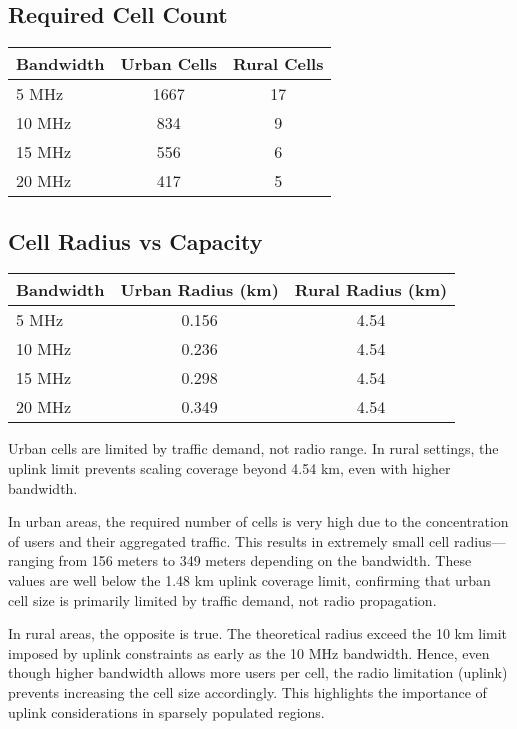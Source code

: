\documentclass[a4paper,12pt]{article}
\begin{document}
\subsection*{Required Cell Count}
\begin{center}
\begin{tabular}{lcc}
\toprule
Bandwidth & Urban Cells & Rural Cells \\
\midrule
5 MHz & 1667 & 17 \\
10 MHz & 834 & 9 \\
15 MHz & 556 & 6 \\
20 MHz & 417 & 5 \\
\bottomrule
\end{tabular}
\end{center}

\subsection*{Cell Radius vs Capacity}
\begin{center}
\begin{tabular}{lcc}
\toprule
Bandwidth & Urban Radius (km) & Rural Radius (km) \\
\midrule
5 MHz & 0.156 & 4.54 \\
10 MHz & 0.236 & 4.54 \\
15 MHz & 0.298 & 4.54 \\
20 MHz & 0.349 & 4.54 \\
\bottomrule
\end{tabular}
\end{center}

Urban cells are limited by traffic demand, not radio range. In rural settings, the uplink limit prevents scaling coverage beyond 4.54 km, even with higher bandwidth.

\bigskip

In urban areas, the required number of cells is very high due to the concentration of users and their aggregated traffic. This results in extremely small cell radius—ranging from 156 meters to 349 meters depending on the bandwidth. These values are well below the 1.48 km uplink coverage limit, confirming that urban cell size is primarily limited by traffic demand, not radio propagation.

In rural areas, the opposite is true. The theoretical radius exceed the 10 km limit imposed by uplink constraints as early as the 10 MHz bandwidth. Hence, even though higher bandwidth allows more users per cell, the radio limitation (uplink) prevents increasing the cell size accordingly. This highlights the importance of uplink considerations in sparsely populated regions.
\end{document}

